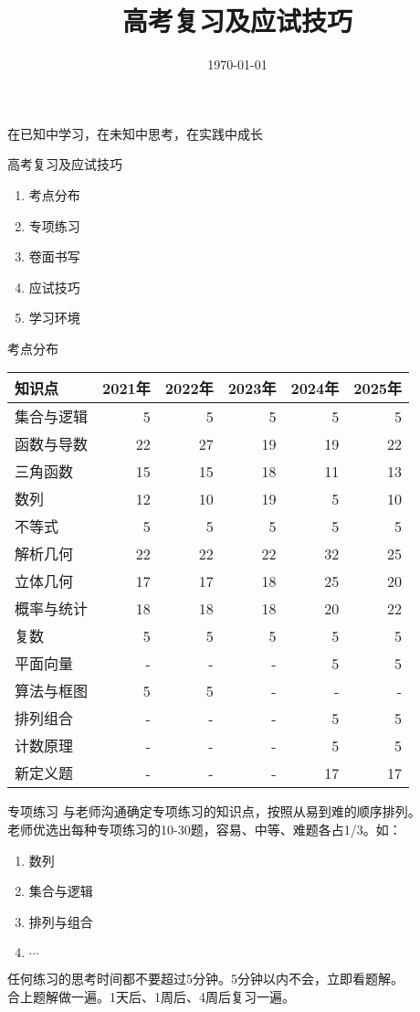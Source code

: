 \documentclass[aspectratio=169]{ctexbeamer} %
\date{\today}
\begin{document}
\begin{frame}{在已知中学习，在未知中思考，在实践中成长}
\title{高考复习及应试技巧}
\titlepage
\end{frame}

\begin{frame}[t]{高考复习及应试技巧}
\begin{enumerate}[label={\arabic*.}]
\item 考点分布
\item 专项练习
\item 卷面书写
\item 应试技巧
\item 学习环境
\end{enumerate}
\end{frame}

\begin{frame}[t]{考点分布}
\begin{longtable}{@{} l r r r r r @{}}
\toprule
知识点 & 2021年 & 2022年 & 2023年 & 2024年 & 2025年 \\
\midrule
集合与逻辑 & 5 & 5 & 5 & 5 & 5 \\
函数与导数 & 22 & 27 & 19 & 19 & 22 \\
三角函数 & 15 & 15 & 18 & 11 & 13 \\
数列 & 12 & 10 & 19 & 5 & 10 \\
不等式 & 5 & 5 & 5 & 5 & 5 \\
解析几何 & 22 & 22 & 22 & 32 & 25 \\
立体几何 & 17 & 17 & 18 & 25 & 20 \\
概率与统计 & 18 & 18 & 18 & 20 & 22 \\
复数 & 5 & 5 & 5 & 5 & 5 \\
平面向量 & - & - & - & 5 & 5 \\
算法与框图 & 5 & 5 & - & - & - \\
排列组合 & - & - & - & 5 & 5 \\
计数原理 & - & - & - & 5 & 5 \\
新定义题 & - & - & - & 17 & 17 \\
\bottomrule
\end{longtable}
\end{frame}

\begin{frame}[t]{专项练习}
与老师沟通确定专项练习的知识点，按照从易到难的顺序排列。\\
老师优选出每种专项练习的10-30题，容易、中等、难题各占1/3。如：\\
\begin{enumerate}[label={\arabic*.}]
\item 数列
\item 集合与逻辑
\item 排列与组合
\item $\cdots$
\end{enumerate}
\alert{任何练习的思考时间都不要超过5分钟。5分钟以内不会，立即看题解。} \\
\alert{合上题解做一遍。1天后、1周后、4周后复习一遍。} \\

\end{frame}
\end{document}
